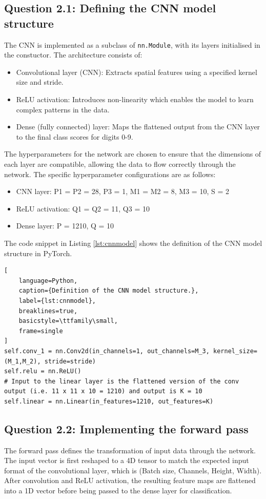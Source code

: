 \documentclass[11pt]{article}
\begin{document}
\subsection*{Question 2.1: Defining the CNN model structure}
The CNN is implemented as a subclass of \texttt{nn.Module}, with its layers initialised in the constuctor. 
The architecture consists of:
\begin{itemize}
    \item Convolutional layer (CNN): Extracts spatial features using a specified kernel size and stride.
    \item ReLU activation: Introduces non-linearity which enables the model to learn complex patterns in the data.
    \item Dense (fully connected) layer: Maps the flattened output from the CNN layer to the final class scores for digits 0-9.
\end{itemize}
The hyperparameters for the network are chosen to ensure that the dimensions of each layer are compatible, allowing the data to flow correctly through the network. 
The specific hyperparameter configurations are as follows:
\begin{itemize}
    \item CNN layer: P1 = P2 = 28, P3 = 1, M1 = M2 = 8, M3 = 10, S = 2
    \item ReLU activation: Q1 = Q2 = 11, Q3 = 10
    \item Dense layer: P = 1210, Q = 10
\end{itemize}

The code snippet in Listing \ref{lst:cnnmodel} shows the definition of the CNN model structure in PyTorch.
\begin{lstlisting}[
    language=Python, 
    caption={Definition of the CNN model structure.},
    label={lst:cnnmodel},
    breaklines=true,
    basicstyle=\ttfamily\small,
    frame=single
]
self.conv_1 = nn.Conv2d(in_channels=1, out_channels=M_3, kernel_size=(M_1,M_2), stride=stride)
self.relu = nn.ReLU()
# Input to the linear layer is the flattened version of the conv output (i.e. 11 x 11 x 10 = 1210) and output is K = 10
self.linear = nn.Linear(in_features=1210, out_features=K)
\end{lstlisting}

\subsection*{Question 2.2: Implementing the forward pass}
The forward pass defines the transformation of input data through the network. The input vector 
is first reshaped to a 4D tensor to match the expected input format of the convolutional layer, which is (Batch size, Channels, Height, Width).
After convolution and ReLU activation, the resulting feature maps are flattened into a 1D vector before being passed to the dense layer for classification.
\end{document}
